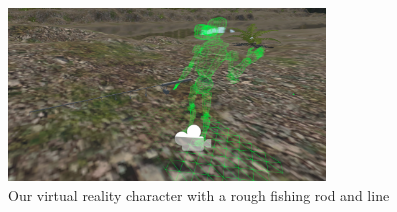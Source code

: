 \documentclass[10pt,journal,compsoc,onecolumn, draftclsnofoot]{IEEEtran}
\begin{document}
\begin{figure}[h]
    \centering
    \includegraphics[width=0.75\textwidth]{fishingrod.png}
    \caption{Our virtual reality character with a rough fishing rod and line}
\end{figure}
\end{document}
